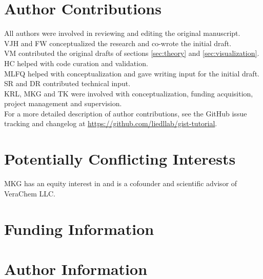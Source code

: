 \documentclass[9pt,tutorial]{livecoms}
\newcommand{\githubrepository}{\url{https://github.com/liedllab/gist-tutorial}}  %
\begin{document}
\section*{Author Contributions}

%
All authors were involved in reviewing and editing the original manuscript. \\  
VJH and FW conceptualized the research and co-wrote the initial draft.\\
VM contributed the original drafts of sections \ref{sec:theory} and \ref{sec:visualization}.\\
HC helped with code curation and validation.\\
MLFQ helped with conceptualization and gave writing input for the initial draft. \\
SR and DR contributed technical input.\\  
KRL, MKG and TK were involved with conceptualization, funding acquisition, project management and supervision.\\

For a more detailed description of author contributions,
see the GitHub issue tracking and changelog at \githubrepository.

\section*{Potentially Conflicting Interests}

MKG has an equity interest in and is a cofounder and scientific advisor of 
VeraChem LLC.

\section*{Funding Information}

\section*{Author Information}
\makeorcid




\end{document}
